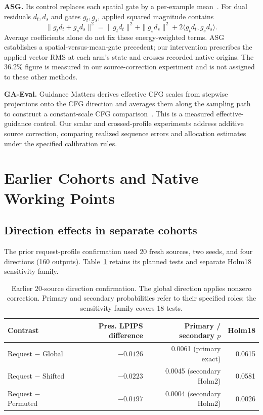 \documentclass[10pt,doubleanonymous]{ieeeconf}
\begin{document}
\textbf{ASG.} Its control replaces each spatial gate by a per-example mean~\cite{li2026asg}. For dual residuals $d_t,d_s$ and gates $g_t,g_s$, applied squared magnitude contains
\begin{equation}
\|g_t d_t+g_s d_s\|^2=\|g_t d_t\|^2+\|g_s d_s\|^2+2\langle g_t d_t,g_s d_s\rangle.
\end{equation}
Average coefficients alone do not fix these energy-weighted terms. ASG establishes a spatial-versus-mean-gate precedent; our intervention prescribes the applied vector RMS at each arm's state and crosses recorded native origins. The 36.2\% figure is measured in our source-correction experiment and is not assigned to these other methods.

\textbf{GA-Eval.} Guidance Matters derives effective CFG scales from stepwise projections onto the CFG direction and averages them along the sampling path to construct a constant-scale CFG comparison~\cite{xie2026guidancematters}. This is a measured effective-guidance control. Our scalar and crossed-profile experiments address additive source correction, comparing realized sequence errors and allocation estimates under the specified calibration rules.

\section{Earlier Cohorts and Native Working Points}\label{sec:development}
\subsection{Direction effects in separate cohorts}
The prior request-profile confirmation used 20 fresh sources, two seeds, and four directions (160 outputs). Table~\ref{tab:old-direction} retains its planned tests and separate Holm18 sensitivity family.

\begin{table}[!t]
\centering\small
\caption{Earlier 20-source direction confirmation. The global direction applies nonzero correction. Primary and secondary probabilities refer to their specified roles; the sensitivity family covers 18 tests.}
\label{tab:old-direction}
\begin{tabular}{lrrr}
\toprule
Contrast & Pres. LPIPS difference & Primary / secondary $p$ & Holm18\\
\midrule
Request $-$ Global & $-0.0126$ & 0.0061 (primary exact) &0.0615\\
Request $-$ Shifted & $-0.0223$ & 0.0045 (secondary Holm2) &0.0581\\
Request $-$ Permuted & $-0.0197$ & 0.0004 (secondary Holm2) &0.0026\\
\bottomrule
\end{tabular}
\end{table}
\end{document}
